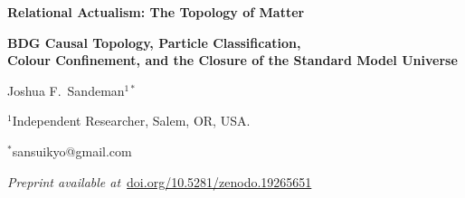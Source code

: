 \documentclass[11pt,a4paper]{article}
\begin{document}
\begin{center}
  {\LARGE\bfseries Relational Actualism: The Topology of Matter\par}
  \vspace{6pt}
  {\large\bfseries BDG Causal Topology, Particle Classification,\\
   Colour Confinement, and the Closure of the Standard Model Universe\par}
  \vspace{14pt}
  {\large Joshua F.\ Sandeman$^{1*}$\par}
  \vspace{4pt}
  {\normalsize $^{1}$Independent Researcher, Salem, OR, USA.\par}
  {\normalsize $^{*}$sansuikyo@gmail.com\par}
  \vspace{8pt}
  {\small\textit{Preprint available at}~\href{https://doi.org/10.5281/zenodo.19265651}{doi.org/10.5281/zenodo.19265651}\par}
  \vspace{14pt}
\end{center}
\end{document}
